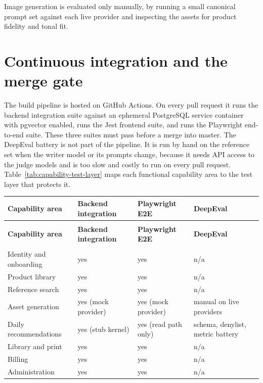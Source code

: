 Image generation is evaluated only manually, by running a small canonical prompt set against each live provider and inspecting the assets for product fidelity and tonal fit.

\section{Continuous integration and the merge gate}
\label{sec:ci-merge-gate}

The build pipeline is hosted on GitHub Actions. On every pull request it runs the backend integration suite against an ephemeral PostgreSQL service container with pgvector enabled, runs the Jest frontend suite, and runs the Playwright end-to-end suite. These three suites must pass before a merge into master. The DeepEval battery is not part of the pipeline. It is run by hand on the reference set when the writer model or its prompts change, because it needs API access to the judge models and is too slow and costly to run on every pull request. Table~\ref{tab:capability-test-layer} maps each functional capability area to the test layer that protects it.

{\small\renewcommand{\arraystretch}{1.3}%
\begin{tabularx}{\textwidth}{|>{\raggedright\arraybackslash}p{4.0cm}|Y|Y|Y|}
\caption{Mapping from functional capability area to the test layer that protects it.}\label{tab:capability-test-layer} \\
\hline
\textbf{Capability area} & \textbf{Backend integration} & \textbf{Playwright E2E} & \textbf{DeepEval} \\
\hline
\endfirsthead
{} \\
\hline
\textbf{Capability area} & \textbf{Backend integration} & \textbf{Playwright E2E} & \textbf{DeepEval} \\
\hline
\endhead
\hline
{} \\
\endfoot
\hline
\endlastfoot
Identity and onboarding   & yes & yes & n/a \\
\hline
Product library           & yes & yes & n/a \\
\hline
Reference search          & yes & yes & n/a \\
\hline
Asset generation          & yes (mock provider) & yes (mock provider) & manual on live providers \\
\hline
Daily recommendations     & yes (stub kernel) & yes (read path only) & schema, denylist, metric battery \\
\hline
Library and print         & yes & yes & n/a \\
\hline
Billing                   & yes & yes & n/a \\
\hline
Administration            & yes & yes & n/a \\
\hline
\end{tabularx}}
